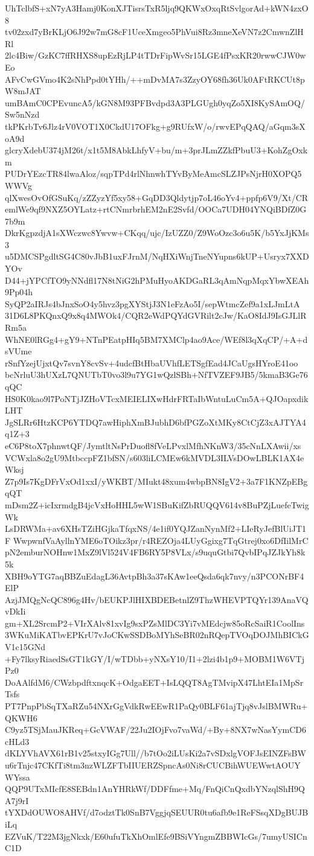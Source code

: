 UhTclbfS+xN7yA3Hamj0KonXJTisrsTxR5ljq9QKWxOxqRtSvlgorAd+kWN4zxO8
tv02zxd7yBrKLjO6J92w7mG8cF1UceXmgeo5PhVui8Rz3mneXeVN7z2CmwnZlHRl
2lc4Biw/GzKC7ffRHXS8upEzRjLP4tTDrFipWvSr15LGE4fPsxKR20rwwCJW0wEo
AFvCwGVmo4K2sNhPpd0tYHh/++mDvMA7s3ZzyOY68fh36Uk0AFtRKCUt8pW8mJAT
umBAmC0CPEvuncA5/kGN8M93PFBvdpd3A3PLGUgh0yqZo5XI8KySAmOQ/Sw5nNzd
tkPKrbTv6Jlz4rV0VOT1X0CkdU17OFkg+g9RUfxW/o/rwvEPqQAQ/aGqm3sXoA9d
glcryXdebU374jM26t/x1t5M8AbkLhfyV+bu/m+3prJLmZZkfPbuU3+KohZgOxkm
PUDrYEzcTR84lwaAloz/sqpTPd4rlNhnwhTYvByMeAmcSLZJPsNjrH0XOPQ5WWVg
qlXwesOvOfGSuKq/zZZyzYf5xy58+GqDD3Qldytjp7oL46oYv4+ppfp6V9/Xt/CR
emlWe9qf9NXZ5OYLatz+rtCNmrbrhEM2nE2Svfd/OOCa7UDH04YNQiBDfZ0G7b9m
DkrKgpzdjA1sXWczwc8Ywvw+CKqq/ujc/IzUZZ0/Z9WoOzc3o6u5K/b5YxJjKMs3
u5DMCSPgdltSG4C80vJbB1uxFJrnM/NqHXiWnjTneNYupns6kUP+Usryx7XXDYOv
D44+jYPCfTO9yNNdfl17N8tNiG2hPMuHyoAKDGaRL3qAmNqpMqxYbwXEAh9Pp04h
SyQP2aIRJs4bJnxSoO4y5hvz3pgXYStjJ3N1eFzAo5I/sepWtmcZef9a1xLJmLtA
31D6L8PKQnxQ9x8q4MWOk4/CQR2eWdPQYdGVRilt2cJw/KaO8IdJ9IsGJLlRRm5a
WhNE0lRGg4+gY9+NTnPEatpHIq5BM7XMClp4ao9Ace/WEf8l3qXqCP/+A+dsVUme
rSnfYzejUjxtQv7svnY8cvSv+4udcfBtHbaUVhfLETSgfEad4JCaUgsHYroE41oo
bcNrluU3hUXzL7QNUTbT0vo3l9u7YG1wQzlSBh+NfTVZEF9JB5/5kmaB3Ge76qQC
HS0K0kao9l7PoNTjJZHoVTcxMEIELIXwHdrFRTaIbWntuLuCm5A+QJOapxdikLHT
JgSLRr6HtzKCP6YTDQ7awHiphXmBJubhD6bfPGZoXtMKy8CtCjZ3xAJTYA4q1Z+3
eC6P8toX7phnwtQF/JymtltNsPrDuofl8fVeLPvxlMfhNKnW3/35cNnLXAwii/xs
VCWxla8o2gU9MtbccpFZ1bfSN/s603liLCMEw6kMVDL3ILVsDOwLBLK1AX4eWksj
Z7p9Is7KgDFrVxOd1xxI/yWKBT/MIukt48xum4wbpBN8IgV2+3a7F1KNZpEBgqQT
mDsm2Z+icIxrmdgB4jcVxHoHHL5wW1SBuKifZbRUQQV614v8BuPZjLuefeTwigWk
LsDRWMa+av6XHsTZiHGjkaTfqxNS/4e1if0YQJZanNynMf2+LIeRyJefBlUiJT1F
WwpwnfVaAyllnYME6oTOikz3pr/r4REZOja4LUyGgixg7TqGtrej0xo6DfIilMrC
pN2emburNOHnw1MxZ9lVl524V4FB6RY5P8VLx/s9uquGtbi7QvbIPqJZJkYh8k5k
XBH9oYTG7aqBBZuEdagL36AvtpBh3a37sKAw1eeQsda6qk7nvy/n3PCONrBF4ElP
AzjJMQgNcQC896g4Hv/bEUKPJlHIXBDEBetnlZ9ThzWHEVPTQYr139AnaVQvDkIi
gm+XL2SrcmP2+VIrXAlv81xvIg9sxPZsMlDC3Yi7vMEdcjw85oRcSaiR1CoolIns
3WKuMiKATbvEPKrU7vJoCKwSSDBoMYhSeBR02nRQepTVOqDOJMhBICkGV1c15GNd
+Fy7lksyRiaedSsGT1kGY/I/wTDbb+yNXsY10/I1+2lzi4b1p9+MOBM1W6VTjPz0
DoAAlfdM6/CWzbpdftxnqcK+OdgaEET+IsLQQT8AgTMvipX47LhtEIa1MpSrTsfs
PT7PnpPbSqTXaRZu54NXrGgVdkRwEEwR1PaQy0BLF61ajTjq8vJslBMWRu+QKWH6
C9yz5TSjMauJKReq+GcVWAF/22Ju2IOjFvo7vaWd/+By+8NX7wNasYymCD6cHLd3
dKLYVhAVX61rB1v25stxyIGg7Ull//b7tOo2iLUsKi2a7vSDxlgVOFJsEINZFsBW
u6rTnjc47CKfTi8tm3nzWLZFTbIIUERZSpncAs0Ni8rCUCBihWUEWwtAOUYWYssa
QQP9UTxMIcfE8SEBdn1AnYHRkWf/DDFfme+Mq/FnQiCnQxdbYNzqlShH9QA7j9rI
tYXDdOUWO8AHVf/d7odztTk0SnB7VggjqSEUUR0tu6afb9e1ReFSsqXDgBUJBiLq
EZVuK/T22M3jgNkxk/E60ufuTkXhOmlEfe9BSiVYngmZBBWIcGs/7umyUSICnC1D
